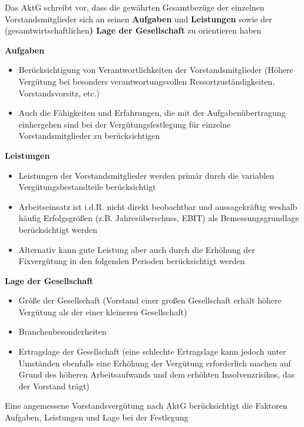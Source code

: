 \documentclass[
]{article}
\providecommand{\tightlist}{%
  \setlength{\itemsep}{0pt}\setlength{\parskip}{0pt}}
\begin{document}
Das AktG schreibt vor, dass die gewährten Gesamtbezüge der einzelnen
Vorstandsmitglieder sich an seinen \textbf{Aufgaben} und
\textbf{Leistungen} sowie der (gesamtwirtschaftlichen\textbf{) Lage der
Gesellschaft} zu orientieren haben

\textbf{Aufgaben}

\begin{itemize}
\tightlist
\item
  Berücksichtigung von Verantwortlichkeiten der Vorstandsmitglieder
  (Höhere Vergütung bei besonders verantwortungsvollen
  Ressortzuständigkeiten, Vorstandsvorsitz, etc.)
\item
  Auch die Fähigkeiten und Erfahrungen, die mit der Aufgabenübertragung
  einhergehen sind bei der Vergütungsfestlegung für einzelne
  Vorstandsmitglieder zu berücksichtigen
\end{itemize}

\textbf{Leistungen}

\begin{itemize}
\tightlist
\item
  Leistungen der Vorstandsmitglieder werden primär durch die variablen
  Vergütungsbestandteile berücksichtigt
\item
  Arbeitseinsatz ist i.d.R. nicht direkt beobachtbar und aussagekräftig
  weshalb häufig Erfolgsgrößen (z.B. Jahresüberschuss, EBIT) als
  Bemessungsgrundlage berücksichtigt werden
\item
  Alternativ kann gute Leistung aber auch durch die Erhöhung der
  Fixvergütung in den folgenden Perioden berücksichtigt werden
\end{itemize}

\textbf{Lage der Gesellschaft}

\begin{itemize}
\tightlist
\item
  Größe der Gesellschaft (Vorstand einer großen Gesellschaft erhält
  höhere Vergütung als der einer kleineren Gesellschaft)
\item
  Branchenbesonderheiten
\item
  Ertragslage der Gesellschaft (eine schlechte Ertragslage kann jedoch
  unter Umständen ebenfalls eine Erhöhung der Vergütung erforderlich
  machen auf Grund des höheren Arbeitsaufwands und dem erhöhten
  Insolvenzrisikos, das der Vorstand trägt)
\end{itemize}

Eine angemessene Vorstandsvergütung nach AktG berücksichtigt die
Faktoren Aufgaben, Leistungen und Lage bei der Festlegung
\end{document}
